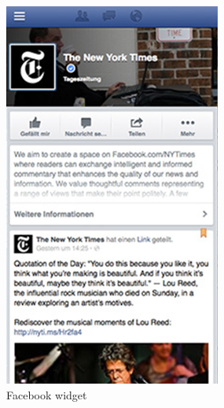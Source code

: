\begin{figure}[htbp]
\begin{subfigure}[b]{0.3\textwidth}
                \includegraphics[width=\textwidth]{images/interview/samples/facebook.png}
                \caption{Facebook widget}
                \label{img:cooking1}
        \end{subfigure}
         \hfill
        \begin{subfigure}[b]{0.3\textwidth}

\end{subfigure}
\end{figure}
